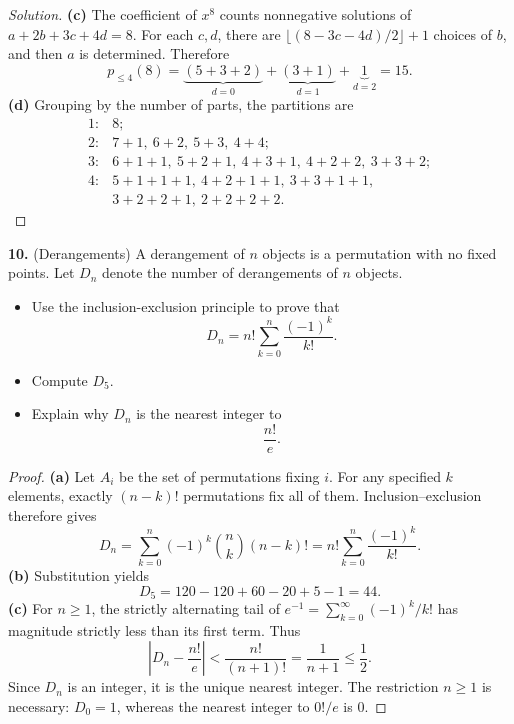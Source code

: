 \documentclass[12pt]{amsart}
\newenvironment{solution}
{\begin{proof}[Solution]}
{\end{proof}}
\begin{document}
\begin{onehalfspace}
\begin{solution}
            \textbf{(c)} The coefficient of $x^8$ counts nonnegative
            solutions of $a+2b+3c+4d=8$. For each $c,d$, there are
            $\lfloor(8-3c-4d)/2\rfloor+1$ choices of $b$, and then $a$
            is determined. Therefore
            \[
                p_{\le4}(8)
                =\underbrace{(5+3+2)}_{d=0}
                 +\underbrace{(3+1)}_{d=1}
                 +\underbrace{1}_{d=2}=15.
            \]
            \textbf{(d)} Grouping by the number of parts, the partitions are
            \[
            \begin{array}{ll}
                1:&8;\\
                2:&7+1,\ 6+2,\ 5+3,\ 4+4;\\
                3:&6+1+1,\ 5+2+1,\ 4+3+1,\ 4+2+2,\ 3+3+2;\\
                4:&5+1+1+1,\ 4+2+1+1,\ 3+3+1+1,\\
                  &3+2+2+1,\ 2+2+2+2.
            \end{array}
            \]
        \end{solution}

        \noindent\textbf{10.} (Derangements) A derangement of $n$ objects is a permutation with no fixed
        points.
        Let $D_n$ denote the number of derangements of $n$ objects.
        \begin{itemize}
            \item[(a)] Use the inclusion-exclusion principle to prove that
            \[
                D_n = n!\sum_{k=0}^n \frac{(-1)^k}{k!}.
            \]
            \item[(b)] Compute $D_5$.
            \item[(c)] Explain why $D_n$ is the nearest integer to
            \[
                \frac{n!}{e}.
            \]
        \end{itemize}

        \begin{proof}
            \textbf{(a)} Let $A_i$ be the set of permutations fixing $i$.
            For any specified $k$ elements, exactly $(n-k)!$ permutations
            fix all of them. Inclusion--exclusion therefore gives
            \[
                D_n=\sum_{k=0}^n(-1)^k\binom nk(n-k)!
                    =n!\sum_{k=0}^n\frac{(-1)^k}{k!}.
            \]
            \textbf{(b)} Substitution yields
            \[
                D_5=120-120+60-20+5-1=44.
            \]
            \textbf{(c)} For $n\ge1$, the strictly alternating tail of
            $e^{-1}=\sum_{k=0}^\infty(-1)^k/k!$ has magnitude strictly
            less than its first term. Thus
            \[
                \left|D_n-\frac{n!}{e}\right|
                <\frac{n!}{(n+1)!}=\frac1{n+1}\le\frac12.
            \]
            Since $D_n$ is an integer, it is the unique nearest integer.
            The restriction $n\ge1$ is necessary: $D_0=1$, whereas the
            nearest integer to $0!/e$ is $0$.
        \end{proof}


\end{onehalfspace}
\end{document}
